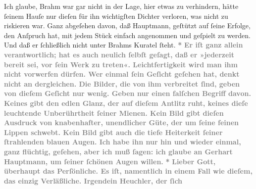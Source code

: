 \begin{ledgroupsized}[t]{13cm}
{{                  Ich glaube, Brahm war gar nicht in der
                  Lage, hier etwas zu verhindern, hätte ſeinem Hauſe nur dieſen für ihn wichtigſten
                  Dichter verloren, was nicht zu riskieren war. Ganz abgeſehen davon, daß Hauptmann, geſtützt auf ſeine Erfolge, den
                  Anſpruch hat, mit jedem Stück einfach angenommen und geſpielt zu werden. Und daß
                  er ſchließlich nicht unter Brahms Kuratel
                  ſteht.}}\pend
           \pstart
           \centering{}\textcolor{gray}{\textbf{*}}\pend
           \pstart
           \noindent{}\textcolor{gray}{\textbf{Er iſt ganz allein verantwortlich; hat es auch neulich ſelbſt
                  geſagt, daß er »jederzeit bereit sei, vor ſein Werk zu treten«. Leichtfertigkeit wird man ihm nicht
                  vorwerfen dürfen. Wer einmal ſein Geſicht geſehen hat, denkt nicht an dergleichen.
                  Die Bilder, die von ihm verbreitet ſind, geben von dieſem Geſicht nur wenig. Geben
                  nur einen falſchen Begriff davon. Keines gibt den edlen Glanz, der auf dieſem
                  Antlitz ruht, keines dieſe leuchtende Unberührtheit ſeiner Mienen. Kein Bild gibt
                  dieſen Ausdruck von knabenhafter, unendlicher Güte, der um ſeine feinen Lippen
                  schwebt. Kein Bild gibt auch die tiefe Heiterkeit ſeiner ſtrahlenden blauen Augen.
                  Ich habe ihn nur hin und wieder einmal, ganz flüchtig, geſehen, aber ich muß
                  ſagen: ich glaube {\pb}an Gerhart Hauptmann, um ſeiner ſchönen Augen
                  willen.}}\pend
           \pstart
           \centering{}\textcolor{gray}{\textbf{*}}\pend
           \pstart
           \noindent{}\textcolor{gray}{\textbf{Lieber Gott, überhaupt das Perſönliche. Es iſt, namentlich in
                  einem Fall wie dieſem, das einzig Verläßliche. Irgendein Heuchler, der ſich
}}
\end{ledgroupsized}
